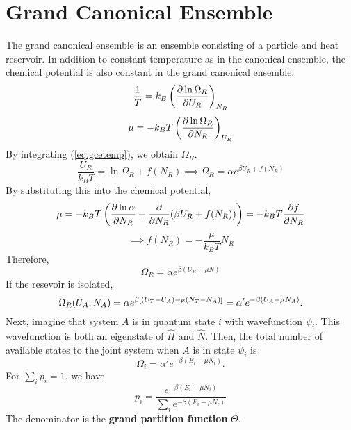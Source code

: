     \section{Grand Canonical Ensemble}
        The grand canonical ensemble is an ensemble consisting of a particle and heat reservoir. In addition to constant temperature as in the canonical ensemble, the chemical potential is also constant in the grand canonical ensemble. 
        \begin{equation}\label{eq:gcetemp}
            \frac{1}{T}=k_B\left( \frac{\partial \ln\Omega_R}{\partial U_R} \right)_{N_R}
        \end{equation}
        \begin{equation}
            \mu = -k_BT\left( \frac{\partial \ln\Omega_R}{\partial N_R} \right)_{U_R}
        \end{equation}
        By integrating (\ref{eq:gcetemp}), we obtain $\Omega_R$.
        \begin{equation}
            \frac{U_R}{k_BT}=\ln\Omega_R+f(N_R)\implies \Omega_R = \alpha e^{\beta U_R+f(N_R)}
        \end{equation}
        By substituting this into the chemical potential,
        \begin{equation}
            \mu = -k_BT\left( \frac{\partial \ln\alpha}{\partial N_R}+\frac{\partial }{\partial N_R}(\beta U_R+f(N_R)) \right) = -k_BT \frac{\partial f}{\partial N_R}
        \end{equation}
        \begin{equation}
            \implies f(N_R)=-\frac{\mu}{k_BT}N_R
        \end{equation}
        Therefore,
        \begin{equation}
            \Omega_R = \alpha e^{\beta(U_R-\mu N)}
        \end{equation}
        If the resevoir is isolated,
        \begin{equation}
            \Omega_R(U_A,N_A)=\alpha e^{\beta\left[ (U_T-U_A)-\mu(N_T-N_A) \right]}=\alpha'e^{-\beta(U_A-\mu N_A)}.
        \end{equation}
        Next, imagine that system $A$ is in quantum state $i$ with wavefunction $\psi_i$. This wavefunction is both an eigenstate of $\hat{H}$ and $\hat{N}$. Then, the total number of available states to the joint system when $A$ is in state $\psi_i$ is
        \begin{equation}
            \Omega_i=\alpha'e^{-\beta(E_i-\mu N_i)}.
        \end{equation}
        For $\sum_ip_i=1$, we have
        \begin{equation}
            p_i = \frac{e^{-\beta(E_i-\mu N_i)}}{\sum_ie^{-\beta(E_i-\mu N_i)}}
        \end{equation}
        The denominator is the \textbf{grand partition function} $\Theta$.
